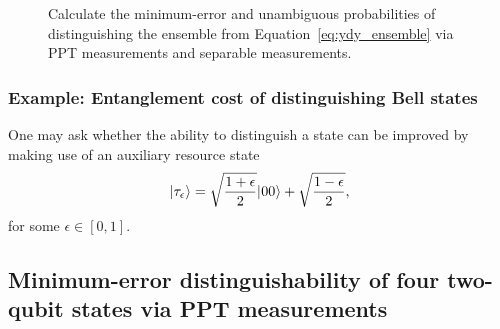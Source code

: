 \documentclass[11pt]{article}
\theoremstyle{definition}
\newcommand{\microspace}{\mspace{0.5mu}}
\newcommand{\ket}[1]{
  \lvert\microspace #1 \microspace \rangle}
\begin{document}
\begin{figure}[!htpb]
    \centering
    
    \caption{Calculate the minimum-error and unambiguous probabilities of
    distinguishing the ensemble from Equation~\eqref{eq:ydy_ensemble} via PPT
    measurements and separable measurements.}
    \label{fig:ppt_ydy}
\end{figure}


\subsubsection*{Example: Entanglement cost of distinguishing Bell states}
\label{sec:entanglement_cost_bell}

One may ask whether the ability to distinguish a state can be improved by
making use of an auxiliary resource state
\begin{equation}
    \ket{\tau_{\epsilon}} = \sqrt{\frac{1+\epsilon}{2}}\ket{00} + \sqrt{\frac{1-\epsilon}{2}},
\end{equation}
for some $\epsilon \in [0, 1]$.

\subsection{Minimum-error distinguishability of four two-qubit states via PPT measurements}
\end{document}
